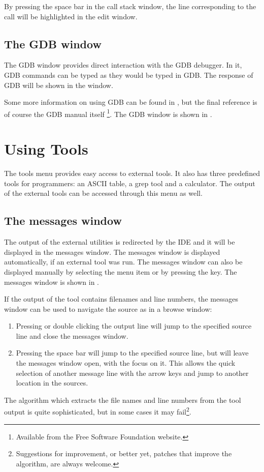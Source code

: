 By pressing the space bar in the call stack window, the line corresponding
to the call will be highlighted in the edit window.

\subsection{The GDB window}
\label{se:gdbwindow}
The GDB window provides direct interaction with the GDB debugger.
In it, GDB commands can be typed as they would be typed in GDB.
The response of GDB will be shown in the window.

Some more information on using GDB can be found in , but
the final reference is of course the GDB manual itself
\footnote{Available from the Free Software Foundation website.}.
The GDB window is shown in .


\section{Using Tools}
\label{se:toolsmenu}
The tools menu provides easy access to external tools. It also has
three predefined tools for programmers: an ASCII table, a grep tool
and a calculator. The output of the external tools can be accessed through
this menu as well.

%
%
\subsection{The messages window}
\label{se:toolsmessages}
The output of the external utilities is redirected by the IDE and it
will be displayed in the messages window. The messages window is
displayed automatically, if an external tool was run. The
messages window can also be displayed manually by selecting the
menu item  or by pressing the  key.
The messages window is shown in .


If the output of the tool contains filenames and line numbers,
the messages window can be used to navigate the source as in a browse
window:
\begin{enumerate}
\item Pressing  or double clicking the output line will jump
to the specified source line and close the messages window.
\item Pressing the space bar will jump to the specified source line, but
will leave the messages window open, with the focus on it. This allows the
quick selection of another message line with the arrow keys and jump to
another location in the sources.
\end{enumerate}
The algorithm which extracts the file names and line numbers from
the tool output is quite sophisticated, but in some cases it may
fail\footnote{Suggestions for improvement, or better yet, patches
that improve the algorithm, are always welcome.}.
%
%
